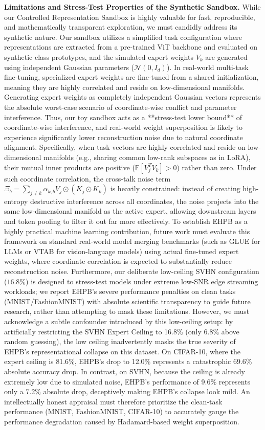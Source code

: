 \textbf{Limitations and Stress-Test Properties of the Synthetic Sandbox.} While our Controlled Representation Sandbox is highly valuable for fast, reproducible, and mathematically transparent exploration, we must candidly address its synthetic nature. Our sandbox utilizes a simplified task configuration where representations are extracted from a pre-trained ViT backbone and evaluated on synthetic class prototypes, and the simulated expert weights $V_k$ are generated using independent Gaussian parameters ($\mathcal{N}(0, I_d)$). In real-world multi-task fine-tuning, specialized expert weights are fine-tuned from a shared initialization, meaning they are highly correlated and reside on low-dimensional manifolds. Generating expert weights as completely independent Gaussian vectors represents the absolute worst-case scenario of coordinate-wise conflict and parameter interference. Thus, our toy sandbox acts as a **stress-test lower bound** of coordinate-wise interference, and real-world weight superposition is likely to experience significantly lower reconstruction noise due to natural coordinate alignment. Specifically, when task vectors are highly correlated and reside on low-dimensional manifolds (e.g., sharing common low-rank subspaces as in LoRA), their mutual inner products are positive ($\mathbb{E}[V_j^T V_k] > 0$) rather than zero. Under such coordinate correlation, the cross-talk noise term $\Xi_b = \sum_{j \neq k} \alpha_{k, b} V_j \odot (K_j \odot K_k)$ is heavily constrained: instead of creating high-entropy destructive interference across all coordinates, the noise projects into the same low-dimensional manifold as the active expert, allowing downstream layers and token pooling to filter it out far more effectively. To establish EHPB as a highly practical machine learning contribution, future work must evaluate this framework on standard real-world model merging benchmarks (such as GLUE for LLMs or VTAB for vision-language models) using actual fine-tuned expert weights, where coordinate correlation is expected to substantially reduce reconstruction noise. Furthermore, our deliberate low-ceiling SVHN configuration ($16.8\%$) is designed to stress-test models under extreme low-SNR edge streaming workloads; we report EHPB's severe performance penalties on clean tasks (MNIST/FashionMNIST) with absolute scientific transparency to guide future research, rather than attempting to mask these limitations. However, we must acknowledge a subtle confounder introduced by this low-ceiling setup: by artificially restricting the SVHN Expert Ceiling to 16.8\% (only 6.8\% above random guessing), the low ceiling inadvertently masks the true severity of EHPB's representational collapse on this dataset. On CIFAR-10, where the expert ceiling is 81.6\%, EHPB's drop to 12.0\% represents a catastrophic 69.6\% absolute accuracy drop. In contrast, on SVHN, because the ceiling is already extremely low due to simulated noise, EHPB's performance of 9.6\% represents only a 7.2\% absolute drop, deceptively making EHPB's collapse look mild. An intellectually honest appraisal must therefore prioritize the clean-task performance (MNIST, FashionMNIST, CIFAR-10) to accurately gauge the performance degradation caused by Hadamard-based weight superposition.

